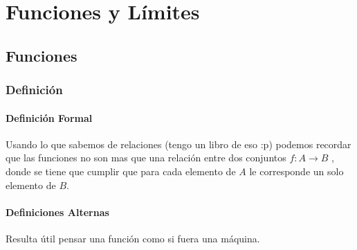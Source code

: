 \documentclass[12pt, fleqn]{report}                             %
\theoremstyle{break}                                            %
\begin{document}
       

\part{Funciones y Límites}

    \chapter{Funciones}
        \clearpage

        \section{Definición}

            \subsection*{Definición Formal}
                Usando lo que sabemos de relaciones (tengo un libro de eso :p) podemos recordar
                que las funciones no son mas que una relación entre dos conjuntos $f : A \to B$
                , donde se tiene que cumplir que para cada elemento de $A$ le corresponde un
                solo elemento de $B$.


            \subsection*{Definiciones Alternas}
            Resulta útil pensar una función como si fuera una máquina.
\end{document}
